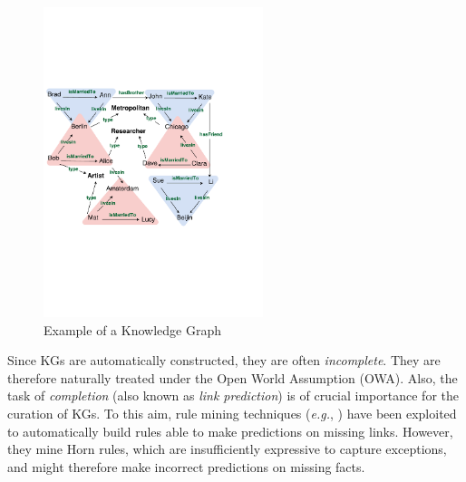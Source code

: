%
%
\begin{figure}[t]
\centering
\includegraphics[width=0.57\textwidth]{figures/kg_advanced_col}
\caption{Example of a Knowledge Graph}
\label{rdf}
\end{figure}
Since KGs are automatically constructed, they are often \textit{incomplete}. %
They are therefore naturally treated under the Open World Assumption (OWA). Also, the task of \textit{completion} (also known as \textit{link prediction}) is of crucial importance for the curation of KGs. To this aim, rule mining techniques (\textit{e.g.}, \cite{newrulemine,DBLP:journals/corr/WangL15i,amieplus}) have been exploited to automatically build rules able to make predictions on missing links. However, they mine Horn rules, which are insufficiently expressive to capture exceptions, and might therefore make incorrect predictions on missing facts.
